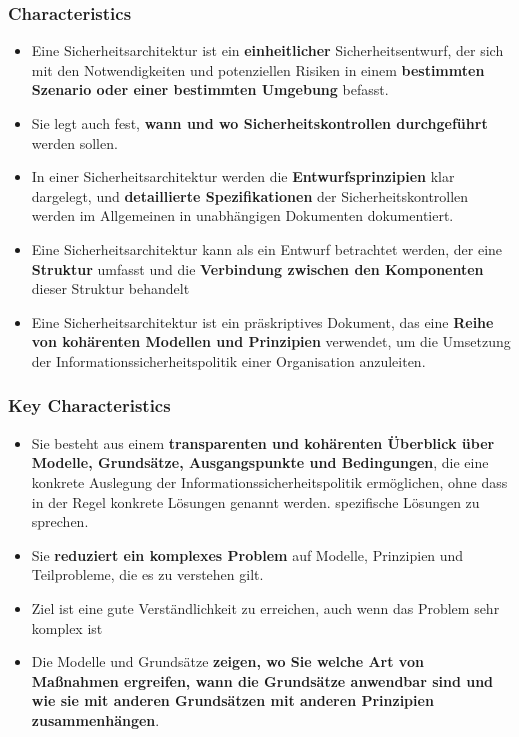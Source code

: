 \subsubsection{Characteristics}
\begin{itemize}
    \item Eine Sicherheitsarchitektur ist ein \textbf{einheitlicher} Sicherheitsentwurf, der sich mit den Notwendigkeiten und potenziellen Risiken in einem \textbf{bestimmten Szenario oder einer bestimmten Umgebung} befasst.
    \item Sie legt auch fest, \textbf{wann und wo Sicherheitskontrollen durchgeführt} werden sollen.
    \item In einer Sicherheitsarchitektur werden die \textbf{Entwurfsprinzipien} klar dargelegt, und \textbf{detaillierte Spezifikationen} der Sicherheitskontrollen werden im Allgemeinen in unabhängigen Dokumenten dokumentiert.
    \item Eine Sicherheitsarchitektur kann als ein Entwurf betrachtet werden, der eine \textbf{Struktur} umfasst und die \textbf{Verbindung zwischen den Komponenten} dieser Struktur behandelt
    \item Eine Sicherheitsarchitektur ist ein präskriptives Dokument, das eine \textbf{Reihe von kohärenten Modellen und Prinzipien} verwendet, um die Umsetzung der Informationssicherheitspolitik einer Organisation anzuleiten.
\end{itemize}

\subsubsection{Key Characteristics}
\begin{itemize}
    \item Sie besteht aus einem \textbf{transparenten und kohärenten Überblick über Modelle, Grundsätze, Ausgangspunkte und Bedingungen}, die eine konkrete Auslegung der Informationssicherheitspolitik ermöglichen, ohne dass in der Regel konkrete Lösungen genannt werden. spezifische Lösungen zu sprechen.
    \item Sie \textbf{reduziert ein komplexes Problem} auf Modelle, Prinzipien und Teilprobleme, die es zu verstehen gilt.
    \item Ziel ist eine gute Verständlichkeit zu erreichen, auch wenn das Problem sehr komplex ist
    \item Die Modelle und Grundsätze \textbf{zeigen, wo Sie welche Art von Maßnahmen ergreifen, wann die Grundsätze anwendbar sind und wie sie mit anderen Grundsätzen mit anderen Prinzipien zusammenhängen}.
\end{itemize}

